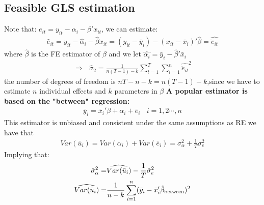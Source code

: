 \documentclass[a4paper,twoside,11pt]{article}
\begin{document}
\subsection{Feasible GLS estimation}
Note that: $e_{it} = y_{it} - \alpha_i - \beta' x_{it}$, we can estimate:
\begin{equation*}
\begin{aligned}
\hat{e}_{it} = y_{it} - \hat{\alpha}_i - \hat{\beta}x_{it} = (y_{it} - \bar y_i ) - (x_{it} - \bar x_i)' \hat{\beta} = \widehat{\ddot e_{it}}
\end{aligned} 
\end{equation*}
where $\hat{\beta}$ is the FE estimator of $\beta$ and we let $\hat{\alpha_i} = \bar y_i - \hat{\beta}' \bar x_i$
\begin{equation*}
\begin{aligned}
\Rightarrow \ \ \ \hat{\sigma}_2 = 
\frac{1}{n(T-1)-k}\sum^T_{t=1} \sum^n_{i=1} \widehat{\ddot e_{it}}^2
\end{aligned} 
\end{equation*}
the number of degrees of freedom is $nT-n-k=n(T-1)-k$,since we have to estimate $n$ individual effects and $k$ parameters in $\beta$
\newline
\newline
\textbf{A popular estimator is based on the "between" regression:}
\begin{equation*}
\begin{aligned}
\bar y_i = \bar x_i' \beta + \alpha_i + \bar e_i \ \ \ \ i=1,2\cdots , n
\end{aligned} 
\end{equation*}
This estimator is unbiased and consistent under the same assumptions as RE
\newline
\newline
we have that
\begin{equation*}
\begin{aligned}
Var(\bar u_i) = Var(\alpha_i) + Var(\bar e_i) = \sigma_\alpha^2 + \frac{1}{T} \sigma_e^2
\end{aligned} 
\end{equation*}
Implying that:
\begin{equation*}
\begin{aligned}
\hat{\sigma}^2_\alpha =& \widehat{Var(\bar u_i)} - \frac{1}{T} \hat{\sigma}_e^2 \\
\widehat{Var(\bar{u}_i)} =& \frac{1}{n-k} \sum^n_{i=1} (\bar y_i - \bar x_i' \hat{\beta}_{\textmd{between}})^2
\end{aligned} 
\end{equation*}
\end{document}
